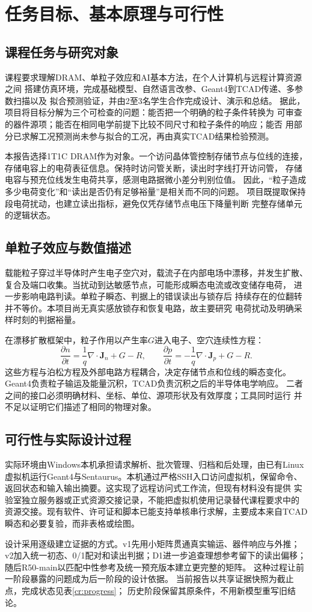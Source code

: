 \section{任务目标、基本原理与可行性}
\label{cr:objectives}
\subsection{课程任务与研究对象}
课程要求理解DRAM、单粒子效应和AI基本方法，在个人计算机与远程计算资源之间
搭建仿真环境，完成基础模型、自然语言改参、Geant4到TCAD传递、多参数扫描以及
拟合预测验证，并由2至3名学生合作完成设计、演示和总结\cite{course}。
据此，项目将目标分解为三个可检查的问题：能否把一个明确的粒子条件转换为
可审查的器件源项；能否在相同电学前提下比较不同尺寸和粒子条件的响应；能否
用部分已求解工况预测尚未参与拟合的工况，再由真实TCAD结果检验预测。

本报告选择1T1C DRAM作为对象。一个访问晶体管控制存储节点与位线的连接，
存储电容上的电荷表征信息。保持时访问管关断，读出时字线打开访问管，
存储电容与预充位线发生电荷共享，感测电路据微小差分判别位值\cite{keeth2001}。
因此，“粒子造成多少电荷变化”和“读出是否仍有足够裕量”是相关而不同的问题。
项目既提取保持段电荷扰动，也建立读出指标，避免仅凭存储节点电压下降量判断
完整存储单元的逻辑状态。

\subsection{单粒子效应与数值描述}
载能粒子穿过半导体时产生电子空穴对，载流子在内部电场中漂移，并发生扩散、
复合及端口收集。当扰动到达敏感节点，可能形成瞬态电流或改变储存电荷，
进一步影响电路判读\cite{label1996}。单粒子瞬态、判据上的错误读出与锁存后
持续存在的位翻转并不等价。本项目尚无真实感放锁存和恢复电路，故主要研究
电荷扰动及明确采样时刻的判据裕量。

在漂移扩散框架中，粒子作用以产生率$G$进入电子、空穴连续性方程：
\begin{equation}
\frac{\partial n}{\partial t}=\frac{1}{q}\nabla\!\cdot\mathbf{J}_n+G-R,\qquad
\frac{\partial p}{\partial t}=-\frac{1}{q}\nabla\!\cdot\mathbf{J}_p+G-R.
\end{equation}
这些方程与泊松方程及外部电路方程耦合，决定存储节点和位线的瞬态变化。
Geant4负责粒子输运及能量沉积，TCAD负责沉积之后的半导体电学响应。
二者之间的接口必须明确材料、坐标、单位、源项形状及有效厚度；工具同时运行
并不足以证明它们描述了相同的物理对象。

\subsection{可行性与实际设计过程}
实际环境由Windows本机承担请求解析、批次管理、归档和后处理，由已有Linux
虚拟机运行Geant4与Sentaurus。本机通过严格SSH入口访问虚拟机，保留命令、
返回状态和输入输出摘要。这实现了远程访问式工作流，但现有材料没有提供
实验室独立服务器或正式资源交接记录，不能把虚拟机使用记录替代课程要求中的
资源交接。现有软件、许可证和脚本已能支持单核串行求解，主要成本来自TCAD
瞬态和必要复验，而非表格或绘图。

设计采用逐级建立证据的方式。v1先用小矩阵贯通真实输运、器件响应与外推；
v2加入统一初态、0/1配对和读出判据；D1进一步追查理想参考留下的读出偏移；
随后R50-main以匹配中性参考及统一预充版本建立更完整的矩阵。
这种过程让前一阶段暴露的问题成为后一阶段的设计依据。
当前报告以共享证据快照为截止点，完成状态见表\ref{cr:progress}；
历史阶段保留其原条件，不用新模型重写旧结论\cite{project}。

